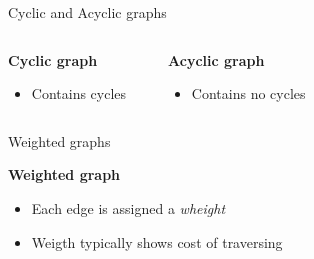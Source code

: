 \documentclass[compress]{beamer}
\begin{document}
\begin{frame}{Cyclic and Acyclic graphs}
  \begin{columns}
    \begin{block}{\textbf{Cyclic graph}}
      \begin{itemize}
        \item Contains cycles
      \end{itemize}
    \end{block}
    \begin{center}
    
  \end{center}
    \begin{block}{\textbf{Acyclic graph}}
      \begin{itemize}
        \item Contains no cycles
      \end{itemize}
    \end{block}
    \begin{center}
    
    \end{center}
  \end{columns}
\end{frame}

\begin{frame}{Weighted graphs}
  \begin{block}{\textbf{Weighted graph}}
    \begin{itemize}
      \item Each edge is assigned a \emph{wheight}
      \item Weigth typically shows cost of traversing
    \end{itemize}
  \end{block}
  \begin{center}
  
  \end{center}
\end{frame}
\end{document}
